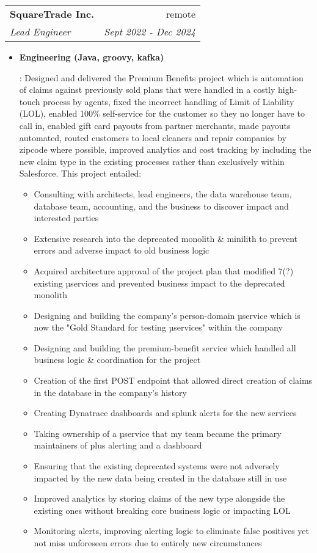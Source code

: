 \documentclass[letterpaper,10pt]{article}
\makeatletter
\newcommand{\resumeItem}[2]{
  \item\small{
    \textbf{#1}{: #2 \vspace{-2pt}}
  }
}
\newcommand{\resumeSubheading}[4]{
  \vspace{-1pt}\item[]
  \begin{tabular*}{0.98\textwidth}{l@{\extracolsep{\fill}}r}
      \hspace{-10pt}\textbf{#1} & #2 \\
      \hspace{-10pt}\textit{\small#3} & \textit{\small #4} \\
    \end{tabular*}\vspace{-5pt}
}
\newcommand{\resumeItemListStart}{\begin{itemize}}
\newcommand{\resumeItemListEnd}{\end{itemize}\vspace{-5pt}}
\makeatother
\begin{document}
    \resumeSubheading
        {SquareTrade Inc.}{remote}
        {Lead Engineer}{Sept 2022 - Dec 2024}
        \resumeItemListStart
        \resumeItem{Engineering (Java, groovy, kafka)}
            {Designed and delivered the Premium Benefits project which is automation of claims against previously sold plans that were handled in a costly high-touch process by agents, fixed the incorrect handling of Limit of Liability (LOL), enabled 100\% self-service for the customer so they no longer have to call in, enabled gift card payouts from partner merchants, made payouts automated, routed customers to local cleaners and repair companies by zipcode where possible, improved analytics and cost tracking by including the new claim type in the existing processes rather than exclusively within Salesforce. This project entailed:
            \begin{itemize}
                \item Consulting with architects, lead engineers, the data warehouse team, database team, accounting, and the business to discover impact and interested parties
                \item Extensive research into the deprecated monolith \& minilith to prevent errors and adverse impact to old business logic
                \item Acquired architecture approval of the project plan that modified 7(?) existing µservices and prevented business impact to the deprecated monolith
                \item Designing and building the company's person-domain µservice which is now the "Gold Standard for testing µservices" within the company
                \item Designing and building the premium-benefit service which handled all business logic \& coordination for the project
                \item Creation of the first POST endpoint that allowed direct creation of claims in the database in the company's history
                \item Creating Dynatrace dashboards and splunk alerts for the new services
                \item Taking ownership of a µservice that my team became the primary maintainers of plus alerting and a dashboard
                \item Ensuring that the existing deprecated systems were not adversely impacted by the new data being created in the database still in use
                \item Improved analytics by storing claims of the new type alongside the existing ones without breaking core business logic or impacting LOL
                \item Monitoring alerts, improving alerting logic to eliminate false positives yet not miss unforeseen errors due to entirely new circumstances
            \end{itemize}
            }
        \resumeItemListEnd
\end{document}
